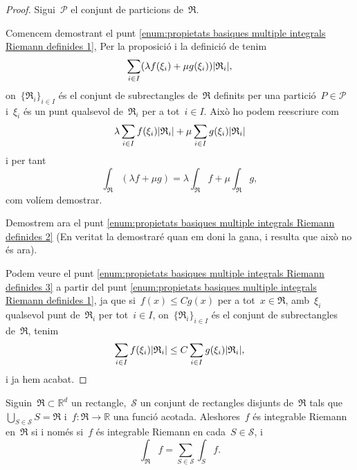 \documentclass[../../main.tex]{subfiles}
\begin{document}
    \begin{proof}
        Sigui~\(\mathcal{P}\) el conjunt de particions de~\(\mathfrak{R}\).

        Comencem demostrant el punt \eqref{enum:propietats basiques multiple integrals Riemann definides 1}, Per la proposició  i la definició de  tenim
        \[
            \sum_{i\in I}\left(\lambda f(\xi_{i})+\mu g(\xi_{i})\right)\abs{\mathfrak{R}_{i}},
        \]
        on~\(\{\mathfrak{R}_{i}\}_{i\in I}\) és el conjunt de subrectangles de~\(\mathfrak{R}\) definits per una partició~\(P\in\mathcal{P}\) i~\(\xi_{i}\) és un punt qualsevol de~\(\mathfrak{R}_{i}\) per a tot~\(i\in I\).
        Això ho podem reescriure com
        \[
            \lambda\sum_{i\in I}f(\xi_{i})\abs{\mathfrak{R}_{i}}+\mu\sum_{i\in I}g(\xi_{i})\abs{\mathfrak{R}_{i}}
        \]
        i per tant
        \[
            \int_{\mathfrak{R}}(\lambda f+\mu g)=\lambda\int_{\mathfrak{R}}f+\mu\int_{\mathfrak{R}}g,
        \]
        com volíem demostrar.

        Demostrem ara el punt \eqref{enum:propietats basiques multiple integrals Riemann definides 2} (En veritat la demostraré quan em doni la gana, i resulta que això no és ara).

        Podem veure el punt \eqref{enum:propietats basiques multiple integrals Riemann definides 3} a partir del punt \eqref{enum:propietats basiques multiple integrals Riemann definides 1}, ja que si~\(f(x)\leq Cg(x)\) per a tot~\(x\in \mathfrak{R}\), amb~\(\xi_{i}\) qualsevol punt de~\(\mathfrak{R}_{i}\) per tot~\(i\in I\), on~\(\{\mathfrak{R}_{i}\}_{i\in I}\) és el conjunt de subrectangles de~\(\mathfrak{R}\), tenim
        \[
            \sum_{i\in I}f(\xi_{i})\abs{\mathfrak{R}_{i}}\leq C\sum_{i\in I}g(\xi_{i})\abs{\mathfrak{R}_{i}},
        \]
        i ja hem acabat.
    \end{proof}
    \begin{theorem}
        \label{thm:podem partir les integrals Riemann}
        Siguin~\({{\mathfrak{R}}}\subset\mathbb{R}^{d}\) un rectangle,~\(\mathcal{S}\) un conjunt de rectangles disjunts de~\(\mathfrak{R}\) tals que~\(\bigcup_{S\in\mathcal{S}}S=\mathfrak{R}\) i~\(f\colon\mathfrak{R}\to\mathbb{R}\) una funció acotada.
        Aleshores~\(f\) és integrable Riemann en~\(\mathfrak{R}\) si i només si~\(f\) és integrable Riemann en cada~\(S\in\mathcal{S}\), i
        \[
            \int_{\mathfrak{R}}f=\sum_{S\in\mathcal{S}}\int_{S}f.
        \]
    \end{theorem}
\end{document}
